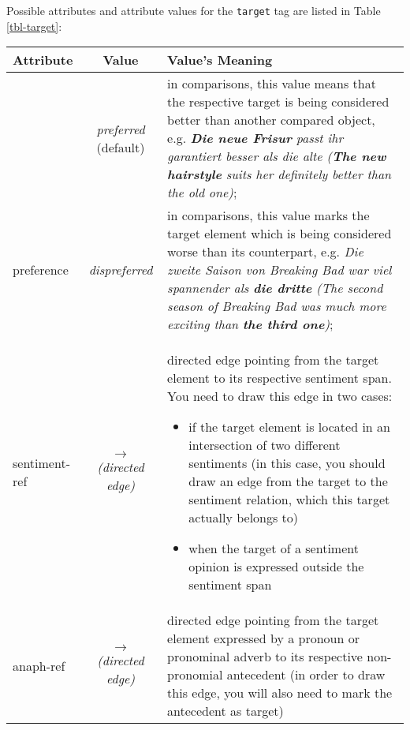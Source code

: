 \documentclass[11pt,a4paper]{article}
\newlength\clmnwidth
\begin{document}
Possible attributes and attribute values for the \texttt{target} tag are
listed in Table \ref{tbl-target}:
\begin{center}
  \begin{tabular}{|l|c|p{\clmnwidth}|}\hline
    Attribute & Value & Value's Meaning\\\hline\label{tbl-target}

    & \textit{preferred} (default) & in comparisons, this value means that the
    respective target is being considered better than another compared object,
    e.g. \textit{\textbf{Die neue Frisur} passt ihr garantiert besser als die
      alte (\textbf{The new hairstyle} suits her definitely better than the
      old one)};\\\cline{2-3}

    \multirow{-2}{*}{preference} & \textit{dispreferred} & in
    comparisons, this value marks the target element which is being
    considered worse than its counterpart, e.g. \textit{Die zweite
      Saison von Breaking Bad war viel spannender als \textbf{die
        dritte} (The second season of Breaking Bad was much more
      exciting than \textbf{the third one})};\\\hline

    sentiment-ref & \textit{$\longrightarrow$\newline(directed edge)} &
    directed edge pointing from the target element to its respective sentiment
    span.  You need to draw this edge in two cases:
    \begin{itemize}
    \item if the target element is located in an intersection of two different
      sentiments (in this case, you should draw an edge from the target to the
      sentiment relation, which this target actually belongs to)

    \item when the target of a sentiment opinion is expressed outside the
      sentiment span
    \end{itemize}\\\hline

    anaph-ref & \textit{$\longrightarrow$\newline(directed edge)} & directed
    edge pointing from the target element expressed by a pronoun or pronominal
    adverb to its respective non-pronomial antecedent (in order to draw this
    edge, you will also need to mark the antecedent as target)\\\hline
  \end{tabular}
\end{center}
\end{document}
